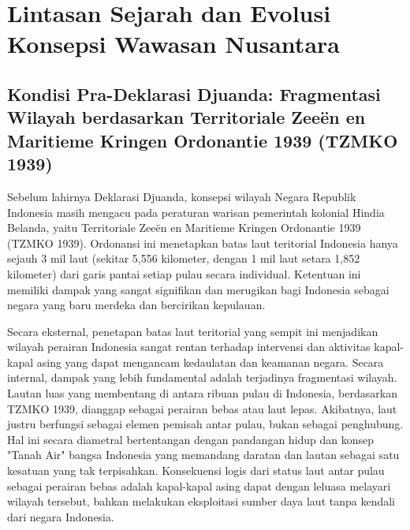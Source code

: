 \documentclass[12pt, a4paper]{article}
\begin{document}
\section{Lintasan Sejarah dan Evolusi Konsepsi Wawasan Nusantara}
\subsection*{Kondisi Pra-Deklarasi Djuanda: Fragmentasi Wilayah berdasarkan Territoriale Zeeën en Maritieme Kringen Ordonantie 1939 (TZMKO 1939)}

Sebelum lahirnya Deklarasi Djuanda, konsepsi wilayah Negara Republik Indonesia masih mengacu pada peraturan warisan pemerintah kolonial Hindia Belanda, yaitu Territoriale Zeeën en Maritieme Kringen Ordonantie 1939 (TZMKO 1939). Ordonansi ini menetapkan batas laut teritorial Indonesia hanya sejauh 3 mil laut (sekitar 5,556 kilometer, dengan 1 mil laut setara 1,852 kilometer) dari garis pantai setiap pulau secara individual. Ketentuan ini memiliki dampak yang sangat signifikan dan merugikan bagi Indonesia sebagai negara yang baru merdeka dan bercirikan kepulauan.  

Secara eksternal, penetapan batas laut teritorial yang sempit ini menjadikan wilayah perairan Indonesia sangat rentan terhadap intervensi dan aktivitas kapal-kapal asing yang dapat mengancam kedaulatan dan keamanan negara. Secara internal, dampak yang lebih fundamental adalah terjadinya fragmentasi wilayah. Lautan luas yang membentang di antara ribuan pulau di Indonesia, berdasarkan TZMKO 1939, dianggap sebagai perairan bebas atau laut lepas. Akibatnya, laut justru berfungsi sebagai elemen pemisah antar pulau, bukan sebagai penghubung. Hal ini secara diametral bertentangan dengan pandangan hidup dan konsep "Tanah Air" bangsa Indonesia yang memandang daratan dan lautan sebagai satu kesatuan yang tak terpisahkan. Konsekuensi logis dari status laut antar pulau sebagai perairan bebas adalah kapal-kapal asing dapat dengan leluasa melayari wilayah tersebut, bahkan melakukan eksploitasi sumber daya laut tanpa kendali dari negara Indonesia.  
\end{document}
